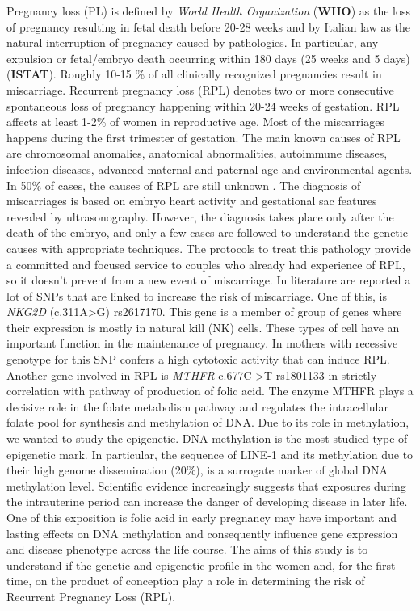 \documentclass[journal,article,submit,moreauthors,pdftex]{Definitions/mdpi}
\begin{document}
\noindent Pregnancy loss (PL) is defined by \textit{World Health Organization} (\textbf{WHO}) as the loss of pregnancy resulting in fetal death before 20-28 weeks and by Italian law as the natural interruption of pregnancy caused by pathologies. In particular, any expulsion or fetal/embryo death occurring within 180 days (25 weeks and 5 days) (\textbf{ISTAT}). Roughly 10-15 \% of all clinically recognized pregnancies result in miscarriage. Recurrent pregnancy loss (RPL) denotes two or more consecutive spontaneous loss of pregnancy happening within 20-24 weeks of gestation. RPL affects at least 1-2\% of women in reproductive age. Most of the miscarriages happens during the first trimester of gestation. The main known causes of RPL are chromosomal anomalies, anatomical abnormalities, autoimmune diseases, infection diseases, advanced maternal and paternal age and environmental agents. In 50\% of cases, the causes of RPL are still unknown \cite{campana2017association, du2019polymorphisms, sudhir2016cytogenetic, oliver2014diagnosis, yakut2015chromosome}. The diagnosis of miscarriages is based on embryo heart activity and gestational sac features revealed by ultrasonography. However, the diagnosis takes place only after the death of the embryo, and only a few cases are followed to understand the genetic causes with appropriate techniques. The protocols to treat this pathology provide a committed and focused service to couples who already had experience of RPL, so it doesn’t prevent from a new event of miscarriage. In literature are reported a lot of SNPs that are linked to increase the risk of miscarriage. One of this, is \textit{NKG2D} (c.311A\textgreater{}G) rs2617170. This gene is a member of group of genes where their expression is mostly in natural kill (NK) cells. These types of cell have an important function in the maintenance of pregnancy. In mothers with recessive genotype for this SNP confers a high cytotoxic activity that can induce RPL. Another gene involved in RPL is \textit{MTHFR} c.677C \textgreater{}T rs1801133 in strictly correlation with pathway of production of folic acid. The  enzyme MTHFR plays  a decisive  role  in  the  folate  metabolism  pathway  and regulates the intracellular folate pool for synthesis and methylation of DNA. Due to its role in methylation, we wanted to study the epigenetic. DNA methylation is the most studied type of epigenetic mark. In particular, the sequence of LINE-1 and its methylation due to their high genome dissemination (20\%), is a surrogate marker of global DNA methylation level. Scientific evidence increasingly suggests that exposures during the intrauterine period can increase the danger of developing disease in later life. One of this exposition is folic acid in early pregnancy may have important and lasting effects on DNA methylation  and  consequently  influence  gene  expression  and  disease phenotype across the life course. The aims of this study is to understand if the genetic and epigenetic profile in the women and, for the first time, on the product of conception play a role in determining the risk of Recurrent Pregnancy Loss (RPL). \\
 
\end{document}
